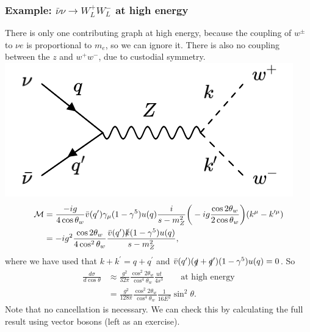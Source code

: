 \begin{figure}[!h]
  \centering
  \hfill
\end{figure}
%
\subsubsection{Example: $\bar{\nu} \nu \to W_L^+ W_L^-$ at high energy}
%
There is only one contributing graph at high energy, because the coupling of $w^\pm$ to $\nu e$ is proportional to $m_e$, so we can ignore it. There is also no coupling between the $z$ and $w^+ w^-$, due to custodial symmetry. 
\newline
\includegraphics[width=0.5\linewidth]{figs/38a.png}
\newline
\begin{equation}
\begin{split}
\mathcal{M} &= \frac{-ig}{4\cos\theta_w}\bar{v}(q^\prime) \gamma_\mu (1-\gamma^5) u(q) \frac{i}{s-m_Z^2}\bigg(-ig\frac{\cos 2 \theta_w}{2\cos\theta_w}\bigg)(k^\mu - k^{\prime \mu}) \\
&= -ig^2\frac{\cos 2 \theta_w}{4 \cos^2 \theta_w} \frac{\bar{v}(q^\prime)\slashed{k}(1-\gamma^5)u(q)}{s-m_Z^2},
\end{split}
\end{equation}
where we have used that $k+ k^\prime = q + q^\prime$ and $\bar{v}(q^\prime)(\slashed{q} + \slashed{q}^\prime)(1-\gamma^5)u(q)=0$. So
\begin{equation}
\begin{split}
\frac{d\sigma}{d\cos\theta} &\approx \frac{g^2}{32\pi} \frac{\cos^2 2\theta_w}{\cos^4\theta_w} \frac{ut}{4s^3} \qquad \text{at high energy} \\
&= \frac{g^2}{128\pi} \frac{\cos^2 2\theta_w}{\cos^4\theta_w} \frac{1}{16E^2} \sin^2\theta.
\end{split}
\end{equation}
Note that no cancellation is necessary. We can check this by calculating the full result using vector bosons (left as an exercise).
%
